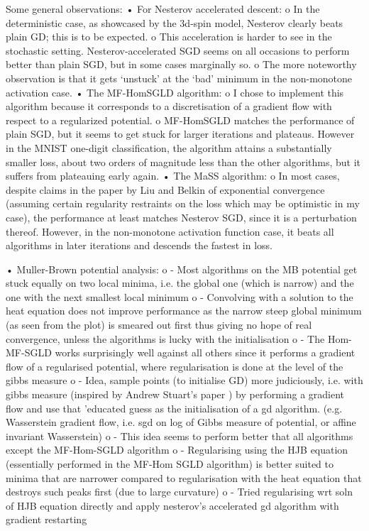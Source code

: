 \documentclass{article}
\begin{document}
Some general observations: 
•	For Nesterov accelerated descent:
o	In the deterministic case, as showcased by the 3d-spin model, Nesterov clearly beats plain GD;  this is to be expected.
o	This acceleration is harder to see in the stochastic setting. Nesterov-accelerated SGD seems on all occasions to perform better than plain SGD, but in some cases marginally so.
o	The more noteworthy observation is that it gets ‘unstuck’ at the ‘bad’ minimum in the non-monotone activation case.
•	The MF-HomSGLD algorithm:
o	I chose to implement this algorithm because it corresponds to a discretisation of a gradient flow with respect to a regularized potential.
o	MF-HomSGLD matches the performance of plain SGD, but it seems to get stuck for larger iterations and plateaus. However in the MNIST one-digit classification, the algorithm attains a substantially smaller loss, about two orders of magnitude less than the other algorithms, but it suffers from plateauing early again.
•	The MaSS algorithm: 
o	In most cases, despite claims in the paper by Liu and Belkin of exponential convergence (assuming certain regularity restraints on the loss which may be optimistic in my case), the performance at least matches Nesterov SGD, since it is a perturbation thereof. However, in the non-monotone activation function case, it beats all algorithms in later iterations and descends the fastest in loss.


•	Muller-Brown potential analysis:
o	- Most algorithms on the MB potential get stuck equally on two local minima, i.e. the global one (which is narrow) and the one with the next smallest local minimum
o	- Convolving with a solution to the heat equation does not improve performance as the narrow steep global minimum (as seen from the plot) is smeared out first thus giving no hope of real convergence, unless the algorithms is lucky with the initialisation
o	- The Hom-MF-SGLD works surprisingly well against all others since it performs a gradient flow of a regularised potential, where regularisation is done at the level of the gibbs measure
o	- Idea, sample points (to initialise GD) more judiciously, i.e. with gibbs measure (inspired by Andrew Stuart's paper ) by performing a gradient flow and use that 'educated guess as the initialisation of a gd algorithm. (e.g. Wasserstein gradient flow, i.e. sgd on log of Gibbs measure of potential, or affine invariant Wasserstein)
o	- This idea seems to perform better that all algorithms except the MF-Hom-SGLD algorithm
o	- Regularising using the HJB equation (essentially performed in the MF-Hom SGLD algorithm) is better suited to minima that are narrower compared to regularisation with the heat equation that destroys such peaks first (due to large curvature)
o	- Tried regularising wrt soln of HJB equation directly and apply nesterov's accelerated gd algorithm with gradient restarting
\end{document}
